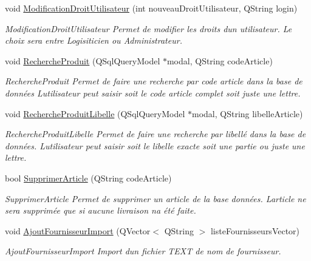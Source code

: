 \begin{DoxyCompactItemize}
void \mbox{\hyperlink{class_database_a3ca1877a1fba73d77764ea5676dfa07d}{Modification\+Droit\+Utilisateur}} (int nouveau\+Droit\+Utilisateur, Q\+String login)
\begin{DoxyCompactList}\small\item\em Modification\+Droit\+Utilisateur Permet de modifier les droits d\textquotesingle{}un utilisateur. Le choix sera entre Logisiticien ou Administrateur. \end{DoxyCompactList}\item 
void \mbox{\hyperlink{class_database_a5f430ffd8bbe1b0bc061ff68fa1cbf6c}{Recherche\+Produit}} (Q\+Sql\+Query\+Model $\ast$modal, Q\+String code\+Article)
\begin{DoxyCompactList}\small\item\em Recherche\+Produit Permet de faire une recherche par code article dans la base de données L\textquotesingle{}utilisateur peut saisir soit le code article complet soit juste une lettre. \end{DoxyCompactList}\item 
void \mbox{\hyperlink{class_database_a445a4944389eda1e1e9c390cdbccae04}{Recherche\+Produit\+Libelle}} (Q\+Sql\+Query\+Model $\ast$modal, Q\+String libelle\+Article)
\begin{DoxyCompactList}\small\item\em Recherche\+Produit\+Libelle Permet de faire une recherche par libellé dans la base de données. L\textquotesingle{}utilisateur peut saisir soit le libelle exacte soit une partie ou juste une lettre. \end{DoxyCompactList}\item 
bool \mbox{\hyperlink{class_database_ac8d2f6181cefec25fe56d1fdbdeca59f}{Supprimer\+Article}} (Q\+String code\+Article)
\begin{DoxyCompactList}\small\item\em Supprimer\+Article Permet de supprimer un article de la base données. L\textquotesingle{}article ne sera supprimée que si aucune livraison n\textquotesingle{}a été faite. \end{DoxyCompactList}\item 
void \mbox{\hyperlink{class_database_af2ff34b4ea218f17f13045c3b303f5d1}{Ajout\+Fournisseur\+Import}} (Q\+Vector$<$ Q\+String $>$ liste\+Fournisseurs\+Vector)
\begin{DoxyCompactList}\small\item\em Ajout\+Fournisseur\+Import Import d\textquotesingle{}un fichier T\+E\+XT de nom de fournisseur. \end{DoxyCompactList}\end{DoxyCompactItemize}
